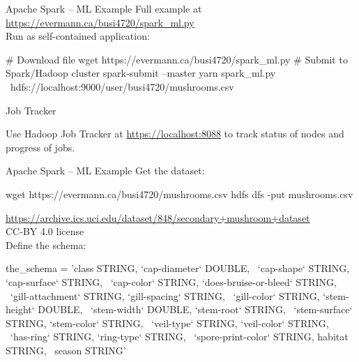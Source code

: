 \documentclass[ignorenonframetext,xcolor=x11names]{beamer}
\begin{document}



\begin{frame}[label=withcode,fragile]{Apache Spark -- ML Example}
Full example at \small\url{https://evermann.ca/busi4720/spark_ml.py}\normalsize \\

Run as self-contained application:
\begin{bashcode}
# Download file
wget https://evermann.ca/busi4720/spark_ml.py
# Submit to Spark/Hadoop cluster
spark-submit --master yarn spark_ml.py \
    hdfs://localhost:9000/user/busi4720/mushrooms.csv
\end{bashcode}

\begin{block}{Job Tracker}
\begin{center}
Use Hadoop Job Tracker at \url{https://localhost:8088} to track status of nodes and progress of jobs.
\end{center}
\end{block}
\end{frame}

\begin{frame}[label=withcode,fragile]{Apache Spark -- ML Example}
Get the dataset:
\begin{bashcode}
wget https://evermann.ca/busi4720/mushrooms.csv
hdfs dfs -put mushrooms.csv
\end{bashcode}
\tiny \url{https://archive.ics.uci.edu/dataset/848/secondary+mushroom+dataset} \\ CC-BY 4.0 license \\

\normalsize Define the schema:
\begin{pythoncode}
the_schema = 'class STRING, `cap-diameter` DOUBLE, \
    `cap-shape` STRING, `cap-surface` STRING, \
    `cap-color` STRING, `does-bruise-or-bleed` STRING, \
    `gill-attachment` STRING, `gill-spacing` STRING, \
    `gill-color` STRING, `stem-height` DOUBLE, \
    `stem-width` DOUBLE, `stem-root` STRING, \
    `stem-surface` STRING, `stem-color` STRING, \
    `veil-type` STRING, `veil-color` STRING, \
    `has-ring` STRING, `ring-type` STRING, \
    `spore-print-color` STRING, habitat STRING, \
    season STRING'
\end{pythoncode}
\end{frame}
\end{document}
